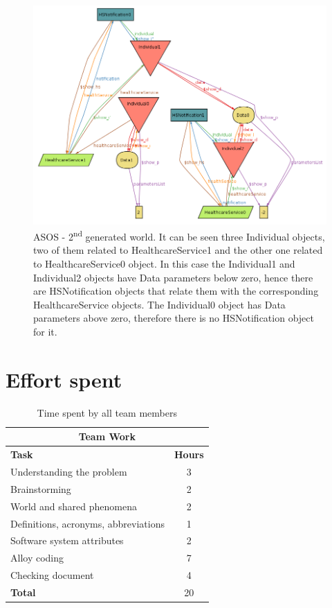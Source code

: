 \documentclass[a4paper, hidelinks, 12pt]{report}
\begin{document}
	\begin{figure}[H]
		\centering
		\includegraphics[width=1\textwidth]{Diagrams/goal_5_world_2.png}
		\caption[ASOS - Second generated world]{ASOS - 2\textsuperscript{nd} generated world. It can be seen three Individual objects, two of them related to HealthcareService1 and the other one related to HealthcareService0 object. In this case the Individual1 and Individual2 objects have Data parameters below zero, hence there are HSNotification objects that relate them with the corresponding HealthcareService objects. The Individual0 object has Data parameters above zero, therefore there is no HSNotification object for it.}
		\label{fig:goal_5_world_2}
	\end{figure}
	
	\chapter{Effort spent}
	\begin{table}[h]
		\centering
		\begin{tabular}{l c}
			\hline\hline
			\multicolumn{2}{c}{\textbf{Team Work}} \\
			\hline
			\textbf{Task} & \textbf{Hours} \\ [0.5ex]
			\hline
			Understanding the problem & 3  \\
			Brainstorming & 2 \\
			World and shared phenomena & 2 \\
			Definitions, acronyms, abbreviations & 1  \\
			Software system attributes & 2 \\
			Alloy coding & 7 \\
			Checking document  & 4  \\
			\hline
			\textbf{Total} & 20  \\
			\hline
		\end{tabular}
		\caption{Time spent by all team members}
		\label{fig:Time spent by all team members}
	\end{table}
	
\end{document}

